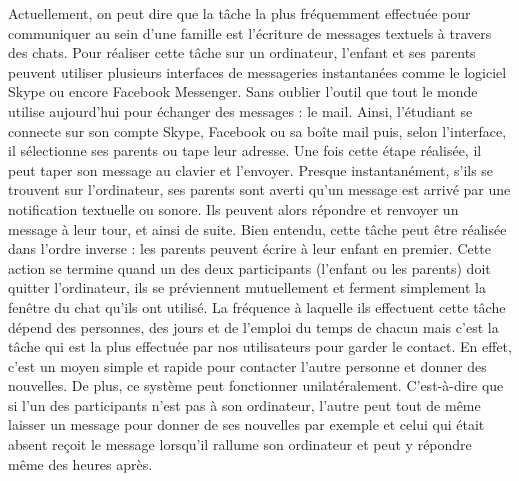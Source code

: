 \documentclass[12pt]{article}
\begin{document}
Actuellement, on peut dire que la tâche la plus fréquemment effectuée pour communiquer au sein d'une famille est l'écriture de messages textuels à travers des chats. Pour réaliser cette tâche sur un ordinateur, l'enfant et ses parents peuvent utiliser plusieurs interfaces de messageries instantanées comme le logiciel Skype ou encore Facebook Messenger. Sans oublier l'outil que tout le monde utilise aujourd'hui pour échanger des messages : le mail. Ainsi, l'étudiant se connecte sur son compte Skype, Facebook ou sa boîte mail puis, selon l'interface, il sélectionne ses parents ou tape leur adresse. Une fois cette étape réalisée, il peut taper son message au clavier et l'envoyer. Presque instantanément, s'ils se trouvent sur l'ordinateur, ses parents sont averti qu'un message est arrivé par une notification textuelle ou sonore. Ils peuvent alors répondre et renvoyer un message à leur tour, et ainsi de suite. Bien entendu, cette tâche peut être réalisée dans l'ordre inverse : les parents peuvent écrire à leur enfant en premier. Cette action se termine quand un des deux participants (l'enfant ou les parents) doit quitter l'ordinateur, ils se préviennent mutuellement et ferment simplement la fenêtre du chat qu'ils ont utilisé. La fréquence à laquelle ils effectuent cette tâche dépend des personnes, des jours et de l'emploi du temps de chacun mais c'est la tâche qui est la plus effectuée par nos utilisateurs pour garder le contact. En effet, c'est un moyen simple et rapide pour contacter l'autre personne et donner des nouvelles. De plus, ce système peut fonctionner unilatéralement. C'est-à-dire que si l'un des participants n'est pas à son ordinateur, l'autre peut tout de même laisser un message pour donner de ses nouvelles par exemple et celui qui était absent reçoit le message lorsqu'il rallume son ordinateur et peut y répondre même des heures après.~\\
\end{document}
